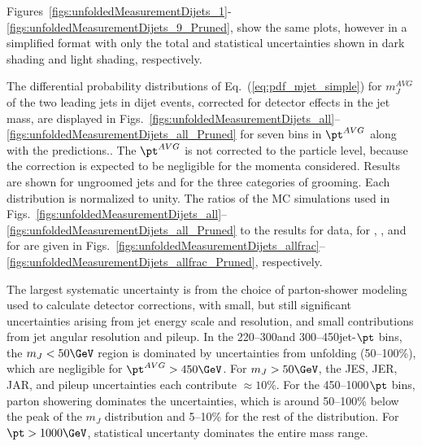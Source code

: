 Figures~\ref{figs:unfoldedMeasurementDijets_1}-
\ref{figs:unfoldedMeasurementDijets_9_Pruned}, 
show the same plots, however in a simplified format with only the
total and statistical uncertainties shown in dark shading and 
light shading, respectively. 
\fi

\ifpas

The differential probability distributions of Eq.~(\ref{eq:pdf_mjet_simple}) 
for $m_J^{AVG}$ of the two leading jets in dijet events,
corrected for detector effects in the jet mass, are displayed in
Figs.~\ref{figs:unfoldedMeasurementDijets_all}--\ref{figs:unfoldedMeasurementDijets_all_Pruned}
for seven bins in $\pt^{AVG}$ along with the \HERWIG predictions..
The $\pt^{AVG}$ is 
not corrected to the particle level, because the correction is
expected to be negligible for the momenta considered.
Results are shown
for ungroomed jets and for the three categories of grooming. 
Each distribution is normalized to unity.
The ratios of the MC simulations used in
Figs.~\ref{figs:unfoldedMeasurementDijets_all}--\ref{figs:unfoldedMeasurementDijets_all_Pruned}
to the results for data, for \PYTHIA, \PYTHIAEIGHT, and for \HERWIG are given in Figs.~\ref{figs:unfoldedMeasurementDijets_allfrac}--\ref{figs:unfoldedMeasurementDijets_allfrac_Pruned}, respectively. 

\fi 

The largest systematic uncertainty is from the choice of parton-shower modeling used to calculate detector corrections, with
small, but still significant uncertainties arising from jet energy scale and resolution, and
small contributions from jet angular resolution and pileup. 
In the 220--300\GeV and 300--450\GeV jet-$\pt$ bins, the $m_J < 50\GeV$ region 
is dominated by uncertainties from unfolding (50--100\%), which are
negligible for $\pt^{AVG}>450\GeV$. 
For $m_J > 50\GeV$, the JES, JER, JAR, and pileup uncertainties each
contribute ${\approx} 10\%$. For the 
450--1000\GeV $\pt$ bins, parton
showering dominates the uncertainties, which is around 50--100\% below
the peak of the $m_J$
distribution and 5--10\% for the rest of the distribution. For 
$\pt > 1000 \GeV$, statistical uncertanty dominates the entire mass range.

